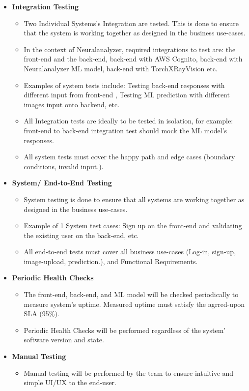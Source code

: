 \documentclass[12pt, titlepage]{article}
\begin{document}
\begin{itemize}
  \item[]{\textbf{Integration Testing}}
  \begin{itemize}
    \item{Two Individual Systems's Integration are tested. This is done to ensure that the system is working together as designed in the business use-cases.}
    \item{In the context of Neuralanalyzer, required integrations to test are: the front-end and the back-end, back-end with AWS Cognito, back-end with Neuralanalyzer ML model, back-end with TorchXRayVision etc.}
    \item{Examples of system tests include: Testing back-end responses with different input from front-end , Testing ML prediction with different images input onto backend, etc.}
    \item{All Integration tests are ideally to be tested in isolation, for example: front-end to back-end integration test should mock the ML model's responses.}
    \item{All system tests must cover the happy path and edge cases (boundary conditions, invalid input.).}
  \end{itemize}
  \item[]{\textbf{System/ End-to-End Testing}}
  \begin{itemize}
    \item{System testing is done to ensure that all systems are working together as designed in the business use-cases.}
    \item{Example of 1 System test cases: Sign up on the front-end and validating the existing user on the back-end, etc.}
    \item{All end-to-end tests must cover all business use-cases (Log-in, sign-up, image-upload, prediction.), and Functional Requirements.}
  \end{itemize}
  \item[]{\textbf{Periodic Health Checks}}
  \begin{itemize}
    \item{The front-end, back-end, and ML model will be checked periodically to measure system's uptime. Measured uptime must satisfy the agrred-upon SLA (95\%).}
    \item{Periodic Health Checks will be performed regardless of the system' software version and state.}
  \end{itemize}
  \item[]{\textbf{Manual Testing}}
  \begin{itemize}
    \item{Manual testing will be performed by the team to ensure intuitive and simple UI/UX to the end-user.}

\end{itemize}
\end{itemize}
\end{document}
